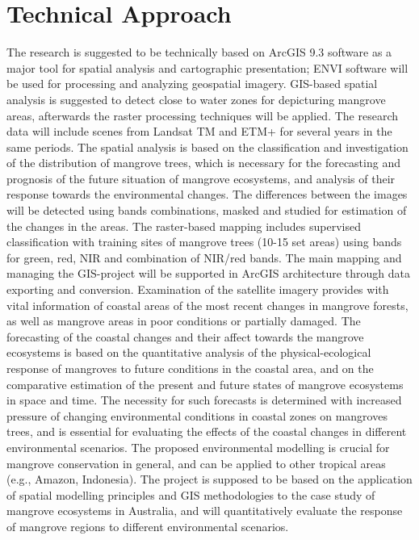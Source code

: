 \documentclass[11pt]{paper}
\begin{document}
\section{Technical Approach}
The research is suggested to be technically based on ArcGIS 9.3 software as a major tool for spatial analysis and cartographic presentation; ENVI software will be used for processing and analyzing geospatial imagery. GIS-based spatial analysis is suggested to detect close to water zones for depicturing mangrove areas, afterwards the raster processing techniques will be applied. The research data will include scenes from Landsat TM and ETM+ for several years in the same periods. The spatial analysis is based on the classification and investigation of the distribution of mangrove trees, which is necessary for the forecasting and prognosis of the future situation of mangrove ecosystems, and analysis of their response towards the environmental changes. The differences between the images will be detected using bands combinations, masked and studied for estimation of the changes in the areas. The raster-based mapping includes supervised classification with training sites of mangrove trees (10-15 set areas) using bands for green, red, NIR and combination of NIR/red bands. The main mapping and managing the GIS-project will be supported in ArcGIS architecture through data exporting and conversion. Examination of the satellite imagery provides with vital information of coastal areas of the most recent changes in mangrove forests, as well as mangrove areas in poor conditions or partially damaged. The forecasting of the coastal changes and their affect towards the mangrove ecosystems is based on the quantitative analysis of the physical-ecological response of mangroves to future conditions in the coastal area, and on the comparative estimation of the present and future states of mangrove ecosystems in space and time. The necessity for such forecasts is determined with increased pressure of changing environmental conditions in coastal zones on mangroves trees, and is essential for evaluating the effects of the coastal changes in different environmental scenarios. The proposed environmental modelling is crucial for mangrove conservation in general, and can be applied to other tropical areas (e.g., Amazon, Indonesia). The project is supposed to be based on the application of spatial modelling principles and GIS methodologies to the case study of mangrove ecosystems in Australia, and will quantitatively evaluate the response of mangrove regions to different environmental scenarios.
\end{document}
